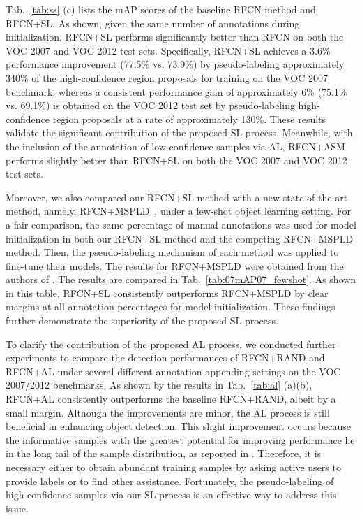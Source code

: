 \documentclass[journal]{IEEEtran}
\begin{document}
{%



Tab.~\ref{tab:ss} (c) lists the mAP scores of the baseline RFCN method and RFCN+SL. As shown, given the same number of annotations during initialization, RFCN+SL performs significantly better than RFCN on both the VOC 2007 and VOC 2012 test sets. Specifically, RFCN+SL achieves a 3.6\% performance improvement (77.5\% vs. 73.9\%) by pseudo-labeling approximately 340\% of the high-confidence region proposals for training on the VOC 2007 benchmark, whereas a consistent performance gain of approximately 6\% (75.1\% vs. 69.1\%) is obtained on the VOC 2012 test set by pseudo-labeling high-confidence region proposals at a rate of approximately 130\%.
These results validate the significant contribution of the proposed SL process. Meanwhile, with the inclusion of the annotation of low-confidence samples via AL, RFCN+{ASM} performs slightly better than RFCN+SL on both the VOC 2007 and VOC 2012 test sets.


Moreover, we also compared our RFCN+SL method with a new state-of-the-art method, namely, RFCN+MSPLD~\cite{MSPLD}, {under} a few-shot object learning setting. {For a fair comparison,} the same percentage of manual annotations was used for model initialization in both our RFCN+SL method and the competing RFCN+MSPLD method. Then, the pseudo-labeling mechanism of each method was applied to fine-tune their models. The results for RFCN+MSPLD were obtained from the authors of \cite{MSPLD}. The results are compared in Tab.~\ref{tab:07mAP07_fewshot}. As shown in this table, RFCN+SL consistently outperforms RFCN+MSPLD by clear margins at all annotation percentages for model initialization. These findings further demonstrate the superiority of the proposed SL process.


To clarify the contribution of the proposed AL process, we conducted further experiments to compare the detection performances of RFCN+RAND and RFCN+AL under several different annotation-appending settings on the VOC 2007/2012 benchmarks. As shown by the results in Tab.~\ref{tab:al} (a)(b), RFCN+AL consistently outperforms the baseline RFCN+RAND, albeit by a small margin. Although the improvements are minor, the AL process is still beneficial in enhancing object detection. This slight improvement occurs because the informative samples with the greatest potential for improving performance lie in the long tail of the sample distribution, as reported in \cite{Wang_2017_CVPR}. Therefore, it is necessary either to obtain abundant training samples by asking active users to provide labels or to find other assistance. Fortunately, {the pseudo-labeling of high-confidence samples via our SL process is an effective way to address this issue.}



}
\end{document}
